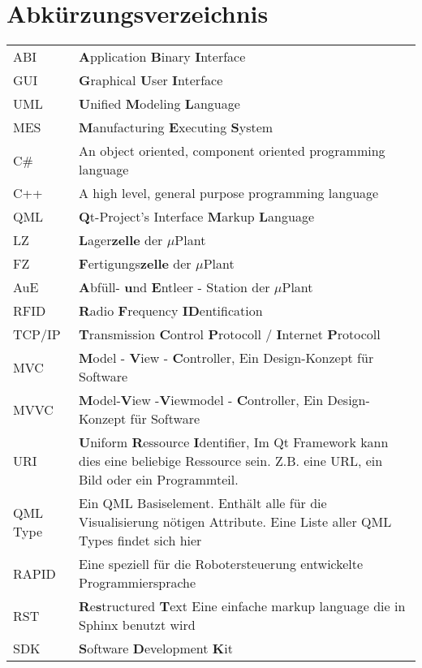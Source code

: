 \chapter*{Abkürzungsverzeichnis}

\begin{center}
	
	\renewcommand{\arraystretch}{1.1}
	
	\begin{supertabular}{p{2.1cm}p{10.9cm}}
		ABI				& \textbf{A}pplication \textbf{B}inary \textbf{I}nterface \\
		GUI				& \textbf{G}raphical \textbf{U}ser \textbf{I}nterface \\
		UML				& \textbf{U}nified \textbf{M}odeling \textbf{L}anguage \\
		MES				& \textbf{M}anufacturing \textbf{E}xecuting \textbf{S}ystem\\
		C\#				& An object oriented, component oriented programming language\\
		C++				& A high level, general purpose programming language\\
		QML				& \textbf{Q}t-Project's Interface \textbf{M}arkup \textbf{L}anguage\\
		LZ				& \textbf{L}ager\textbf{zelle} der $\mu$Plant\\
		FZ				& \textbf{F}ertigungs\textbf{zelle} der $\mu$Plant \\
		AuE				& \textbf{A}bfüll- \textbf{u}nd \textbf{E}ntleer - Station der $\mu$Plant \\
		RFID			& \textbf{R}adio \textbf{F}requency \textbf{ID}entification\\
		TCP/IP			& \textbf{T}ransmission \textbf{C}ontrol \textbf{P}rotocoll / \textbf{I}nternet \textbf{P}rotocoll\\
		MVC				& \textbf{M}odel - \textbf{V}iew - \textbf{C}ontroller, Ein Design-Konzept für Software\\
		MVVC			& \textbf{M}odel-\textbf{V}iew -\textbf{V}iewmodel - \textbf{C}ontroller, Ein Design-Konzept für Software\\
		URI				& \textbf{U}niform \textbf{R}essource \textbf{I}dentifier, Im Qt Framework kann dies eine beliebige
						  Ressource sein. Z.B. eine URL, ein Bild oder ein Programmteil. \\
		QML Type		& Ein QML Basiselement. Enthält alle für die Visualisierung nötigen Attribute. Eine Liste
						  aller QML Types findet sich hier \cite{qmlTypeList}\\
		RAPID			& Eine speziell für die Robotersteuerung entwickelte Programmiersprache\\
		RST				& \textbf{R}e\textbf{s}tructured \textbf{T}ext Eine einfache markup language die in Sphinx benutzt wird\\
		SDK				& \textbf{S}oftware \textbf{D}evelopment \textbf{K}it\\
	\end{supertabular}

\end{center}